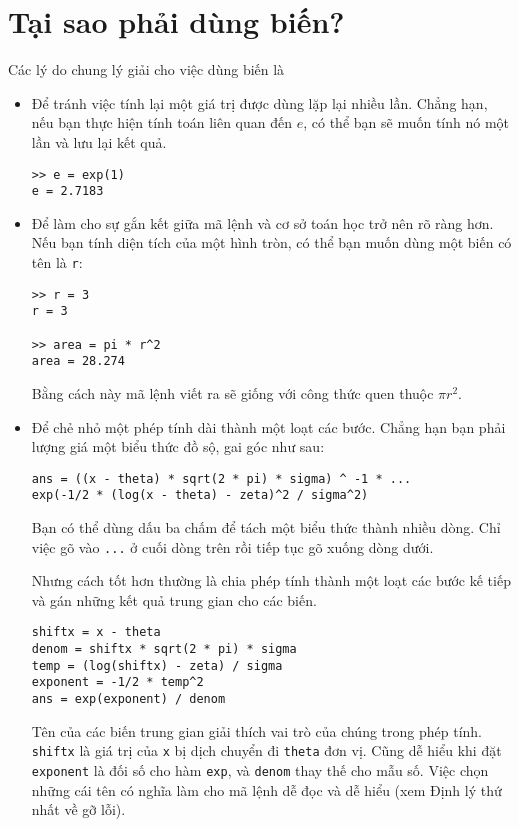 \documentclass[12pt]{book}
\begin{document}
\section{Tại sao phải dùng biến?}

Các lý do chung lý giải cho việc dùng biến là

\begin{itemize}

\item Để tránh việc tính lại một giá trị được dùng lặp lại nhiều lần.
Chẳng hạn, nếu bạn thực hiện tính toán liên quan đến $e$, có thể
bạn sẽ muốn tính nó một lần và lưu lại kết quả.

\begin{verbatim}
>> e = exp(1)
e = 2.7183
\end{verbatim}


\item Để làm cho sự gắn kết giữa mã lệnh và cơ sở toán học trở nên
rõ ràng hơn. Nếu bạn tính diện tích của một hình tròn, có thể bạn muốn
dùng một biến có tên là {\tt r}:

\begin{verbatim}
>> r = 3
r = 3

>> area = pi * r^2
area = 28.274
\end{verbatim}
%
Bằng cách này mã lệnh viết ra sẽ giống với công thức quen thuộc $\pi r^2$.


\item Để chẻ nhỏ một phép tính dài thành một loạt các bước. Chẳng hạn
bạn phải lượng giá một biểu thức đồ sộ, gai góc như sau:

\begin{verbatim}
ans = ((x - theta) * sqrt(2 * pi) * sigma) ^ -1 * ...
exp(-1/2 * (log(x - theta) - zeta)^2 / sigma^2)
\end{verbatim}
%
Bạn có thể dùng dấu ba chấm để tách một biểu thức thành nhiều dòng.
Chỉ việc gõ vào {\tt ...} ở cuối dòng trên rồi tiếp tục gõ xuống dòng dưới.

Nhưng cách tốt hơn thường là chia phép tính thành một loạt các bước
kế tiếp và gán những kết quả trung gian cho các biến.

\begin{verbatim}
shiftx = x - theta
denom = shiftx * sqrt(2 * pi) * sigma
temp = (log(shiftx) - zeta) / sigma
exponent = -1/2 * temp^2
ans = exp(exponent) / denom
\end{verbatim}
%
Tên của các biến trung gian giải thích vai trò của chúng trong phép tính.
{\tt shiftx} là giá trị của {\tt x} bị dịch chuyển đi {\tt theta} đơn vị. Cũng 
dễ hiểu khi đặt {\tt exponent} là đối số cho hàm {\tt exp}, và {\tt denom} 
thay thế cho mẫu số. Việc chọn những cái tên có nghĩa làm cho mã lệnh 
dễ đọc và dễ hiểu (xem Định lý thứ nhất về gỡ lỗi).

\end{itemize}
\end{document}
